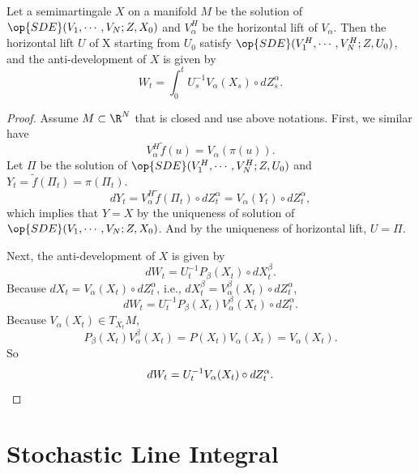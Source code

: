 \begin{prop}
    Let a semimartingale $X$ on a manifold $M$ be the solution of $\op{SDE}(V_1,\cdots,V_N;Z,X_0)$ and $V_\alpha^H$ be the horizontal lift of $V_\alpha$. Then the horizontal lift $U$ of X starting from $U_0$ satisfy $\op{SDE}(V^H_1,\cdots,V^H_N;Z,U_0)$, and the anti-development of $X$ is given by
    \begin{equation*}
        W_t = \int_0^t U_s^{-1}V_\alpha(X_s) \circ dZ^\alpha_s.
    \end{equation*}
\end{prop}
\begin{proof}
    Assume $M \subset \R^N$ that is closed and use above notations. First, we similar have
    \begin{equation*}
        V_\alpha^H \widetilde{f}(u) = V_\alpha(\pi(u)).
    \end{equation*}
    Let $\Pi$ be the solution of $\op{SDE}(V^H_1,\cdots,V^H_N;Z,U_0)$ and $Y_t = \widetilde{f}(\Pi_t) = \pi(\Pi_t)$. 
    \begin{equation*}
        dY_t = V^H_\alpha\widetilde{f}(\Pi_t) \circ dZ^\alpha_t = V_\alpha(Y_t) \circ dZ^\alpha_t,
    \end{equation*}
    which implies that $Y=X$ by the uniqueness of solution of $\op{SDE}(V_1,\cdots,V_N;Z,X_0)$. And by the uniqueness of horizontal lift, $U = \Pi$.

    Next, the anti-development of $X$ is given by
    \begin{equation*}
        dW_t = U_t^{-1}P_\beta(X_t) \circ dX_t^\beta.
    \end{equation*}
    Because $dX_t = V_\alpha(X_t) \circ dZ^\alpha_t$, i.e., $dX^\beta_t = V^\beta_\alpha(X_t) \circ dZ^\alpha_t$,
    \begin{equation*}
        dW_t = U_t^{-1}P_\beta(X_t)V^\beta_\alpha(X_t) \circ dZ^\alpha_t.
    \end{equation*}
    Because $V_\alpha(X_t) \in T_{X_t}M$,
    \begin{equation*}
        P_\beta(X_t)V^\beta_\alpha(X_t) = P(X_t)V_\alpha(X_t) = V_\alpha(X_t).
    \end{equation*}
    So
    \begin{equation*}
        dW_t = U_t^{-1}V_\alpha(X_t)\circ dZ^\alpha_t. \qedhere
    \end{equation*}
\end{proof}

\section{Stochastic Line Integral}

